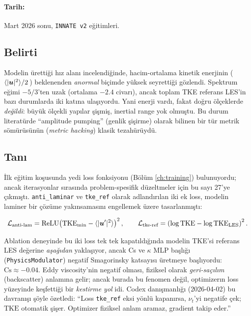 \paragraph{Tarih:} Mart 2026 sonu, \texttt{INNATE v2} eğitimleri.

\subsection*{Belirti}

Modelin ürettiği hız alanı incelendiğinde, hacim-ortalama kinetik enerjinin (\,$\langle |\bm{u}|^2 \rangle / 2$\,) beklenenden \textit{anormal} biçimde yüksek seyrettiği gözlendi. Spektrum eğimi $-5/3$'ten uzak (ortalama $-2.4$ civarı), ancak toplam TKE referans LES'in bazı durumlarda iki katına ulaşıyordu. Yani enerji vardı, fakat doğru ölçeklerde \textit{değildi}: büyük ölçekli yapılar şişmiş, inertial range yok olmuştu. Bu durum literatürde ``amplitude pumping'' (genlik şişirme) olarak bilinen bir tür metrik sömürüsünün (\textit{metric hacking}) klasik tezahürüydü.

\subsection*{Tanı}

İlk eğitim koşusunda yedi loss fonksiyonu (Bölüm \ref{ch:training}) bulunuyordu; ancak iterasyonlar sırasında problem-spesifik düzeltmeler için bu sayı 27'ye çıkmıştı. \texttt{anti\_laminar} ve \texttt{tke\_ref} olarak adlandırılan iki ek loss, modelin laminer bir çözüme yakınsamasını engellemek üzere tasarlanmıştı:

\begin{equation}
    \mathcal{L}_{\text{anti-lam}} = \mathrm{ReLU}\!\left( \mathrm{TKE}_{\min} - \langle |\bm{u}'|^2 \rangle \right)^2,
    \qquad
    \mathcal{L}_{\text{tke-ref}} = \left( \log \mathrm{TKE} - \log \mathrm{TKE}_{\text{LES}} \right)^2.
\end{equation}

Ablation deneyinde bu iki loss tek tek kapatıldığında modelin TKE'si referans LES değerine \textit{aşağıdan} yaklaşıyor, ancak Cs ve $\kappa$ MLP başlığı (\texttt{PhysicsModulator}) negatif Smagorinsky katsayısı üretmeye başlıyordu: $\mathrm{Cs} \approx -0.04$. Eddy viscosity'nin negatif olması, fiziksel olarak \textit{geri-saçılım} (backscatter) anlamına gelir; ancak burada bu fenomen değil, optimizerın loss yüzeyinde keşfettiği bir \textit{kestirme yol} idi. Codex danışmanlığı (2026-04-02) bu davranışı şöyle özetledi: ``Loss \texttt{tke\_ref} eksi yönlü kapanırsa, $\nu_t$'yi negatife çek; $\mathrm{TKE}$ otomatik şişer. Optimizer fiziksel anlam aramaz, gradient takip eder.''

